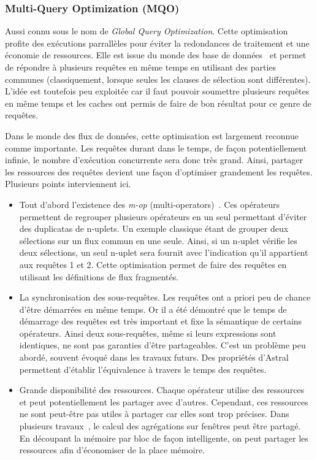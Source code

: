 \subsubsection{Multi-Query Optimization (MQO)}
Aussi connu sous le nom de \textit{Global Query Optimization}. Cette optimisation profite des exécutions parrallèles pour éviter la redondances de traitement et une économie de ressources. Elle est issue du monde des base de données~\cite{Sellis:mqo} et permet de répondre à plusieurs requêtes en même temps en utilisant des parties communes (classiquement, lorsque seules les clauses de sélection sont différentes). L'idée est toutefois peu exploitée car il faut pouvoir soumettre plusieurs requêtes en même temps et les caches ont permis de faire de bon résultat pour ce genre de requêtes. 

Dans le monde des flux de données, cette optimisation est largement reconnue comme importante. Les requêtes durant dans le temps, de façon potentiellement infinie, le nombre d'exécution concurrente sera donc très grand. Ainsi, partager les ressources des requêtes devient une façon d'optimiser grandement les requêtes. Plusieurs points interviennent ici.
\begin{itemize}
 \item Tout d'abord l'existence des \textit{m-op} (multi-operators)~\cite{Hong:mqo}. Ces opérateurs permettent de regrouper plusieurs opérateurs en un seul permettant d'éviter des duplicatas de n-uplets. Un exemple classique étant de grouper deux sélections sur un flux commun en une seule. Ainsi, si un n-uplet vérifie les deux sélections, un seul n-uplet sera fournit avec l'indication qu'il appartient aux requêtes 1 et 2. Cette optimisation permet de faire des requêtes en utilisant les définitions de flux fragmentés.
 \item La synchronisation des sous-requêtes. Les requêtes ont a priori peu de chance d'être démarrées en même temps. Or il a été démontré que le temps de démarrage des requêtes est très important et fixe la sémantique de certains opérateurs. Ainsi deux sous-requêtes, même si leurs expressions sont identiques, ne sont pas garanties d'être partageables. C'est un problème peu abordé, souvent évoqué dans les travaux futurs. Des propriétés d'Astral permettent d'établir l'équivalence à travers le temps des requêtes. 
 \item Grande disponibilité des ressources. Chaque opérateur utilise des ressources et peut potentiellement les partager avec d'autres. Cependant, ces ressources ne sont peut-être pas utiles à partager car elles sont trop précises. Dans plusieurs travaux~\cite{Arasu:resource}, le calcul des agrégations sur fenêtres peut être partagé. En découpant la mémoire par bloc de façon intelligente, on peut partager les ressources afin d'économiser de la place mémoire.
\end{itemize}

